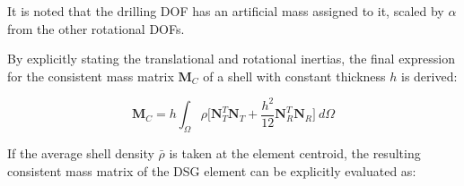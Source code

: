 It is noted that the drilling DOF has an artificial mass assigned to it, scaled by $\alpha$ from the other rotational DOFs.

By explicitly stating the translational and rotational inertias, the final expression for the consistent mass matrix $\mathbf{M}_C$ of a shell with constant thickness $h$ is derived:

\begin{equation} 
\mathbf{M}_C
=
h
\int_{\Omega} 
\rho 
\Big[
\mathbf{N}_T^T
\mathbf{N}_T
+
\frac{h^2}{12}
\mathbf{N}_R^T
\mathbf{N}_R
\Big]
\ d\Omega
\label{eqt17_10}
\end{equation}

If the average shell density $\bar{\rho}$ is taken at the element centroid, the resulting consistent mass matrix of the DSG element can be explicitly evaluated as:

